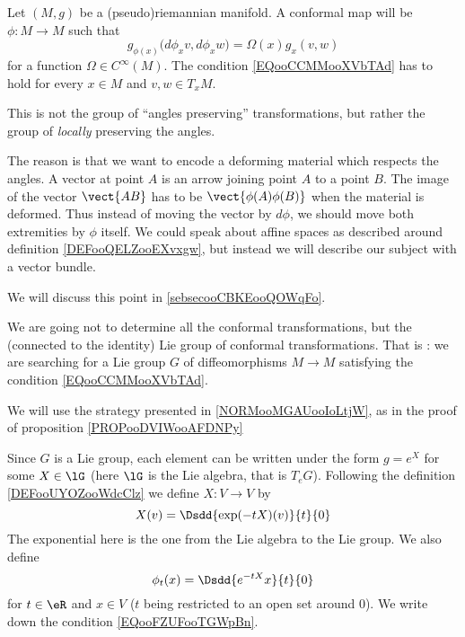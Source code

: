 \begin{definition}
Let \( (M,g)\) be a (pseudo)riemannian manifold. A conformal map will be \( \phi\colon M\to M\) such that
\begin{equation}        \label{EQooCCMMooXVbTAd}
    g_{\phi(x)}\big( d\phi_xv,d\phi_xw \big)=\Omega(x)g_x(v,w)
\end{equation}
for a function \( \Omega\in C^{\infty}(M)\). The condition \eqref{EQooCCMMooXVbTAd} has to hold for every \( x\in M\) and \( v,w\in T_xM\).
\end{definition}
    

\begin{normaltext}  \label{NorooVEVOooRBpvXF}
    This is not the group of ``angles preserving'' transformations, but rather the group of \emph{locally} preserving the angles.

The reason is that we want to encode a deforming material which respects the angles. A vector at point \( A\) is an arrow joining point \( A\) to a point \( B\). The image of the vector \( \vect{ AB }\) has to be \( \vect{ \phi(A)\phi(B) }\) when the material is deformed. Thus instead of moving the vector by \( d\phi\), we should move both extremities by \( \phi\) itself. We could speak about affine spaces as described around definition \ref{DEFooQELZooEXvxgw}, but instead we will describe our subject with a vector bundle.

We will discuss this point in \ref{sebsecooCBKEooQOWqFo}.
\end{normaltext}

\begin{normaltext}
    We are going not to determine all the conformal transformations, but the (connected to the identity) Lie group of conformal transformations. That is : we are searching for a Lie group \( G\) of diffeomorphisms \( M\to M\) satisfying the condition \eqref{EQooCCMMooXVbTAd}.
\end{normaltext}

We will use the strategy presented in \ref{NORMooMGAUooIoLtjW}, as in the proof of proposition \ref{PROPooDVIWooAFDNPy}

Since \( G\) is a Lie group, each element can be written under the form \( g= e^{X}\) for some \( X\in\lG\) (here \( \lG\) is the Lie algebra, that is \( T_eG\)). Following the definition \ref{DEFooUYOZooWdcClz} we define \( X\colon V\to V\) by
\begin{equation}
    X(v)=\Dsdd{  \exp(-tX)(v) }{t}{0}
\end{equation}
The exponential here is the one from the Lie algebra to the Lie group. We also define
\begin{equation}
    \phi_t(x)=\Dsdd{  e^{-tX}x }{t}{0}
\end{equation}
for \( t\in \eR\) and \( x\in V\) (\( t\) being restricted to an open set around \( 0\)). We write down the condition \eqref{EQooFZUFooTGWpBn}.



